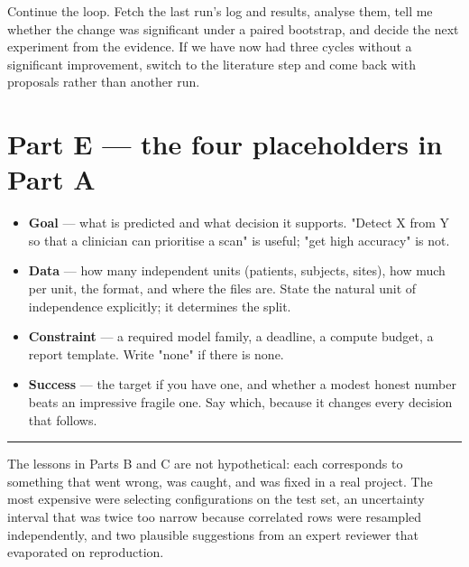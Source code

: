 \documentclass[11pt,a4paper]{article}
\begin{document}
\begin{promptbox}
\small
Continue the loop. Fetch the last run's log and results, analyse them, tell me
whether the change was significant under a paired bootstrap, and decide the next
experiment from the evidence. If we have now had three cycles without a
significant improvement, switch to the literature step and come back with
proposals rather than another run.
\end{promptbox}

\section{Part E --- the four placeholders in Part A}

\begin{itemize}
\item \textbf{Goal} --- what is predicted and what decision it supports. "Detect
X from Y so that a clinician can prioritise a scan" is useful; "get high
accuracy" is not.
\item \textbf{Data} --- how many independent units (patients, subjects, sites),
how much per unit, the format, and where the files are. State the natural unit
of independence explicitly; it determines the split.
\item \textbf{Constraint} --- a required model family, a deadline, a compute
budget, a report template. Write "none" if there is none.
\item \textbf{Success} --- the target if you have one, and whether a modest
honest number beats an impressive fragile one. Say which, because it changes
every decision that follows.
\end{itemize}

\vspace{6pt}
\hrule
\vspace{6pt}
{\footnotesize\color{soft}
The lessons in Parts B and C are not hypothetical: each corresponds to something
that went wrong, was caught, and was fixed in a real project. The most expensive
were selecting configurations on the test set, an uncertainty interval that was
twice too narrow because correlated rows were resampled independently, and two
plausible suggestions from an expert reviewer that evaporated on reproduction.}
\end{document}
